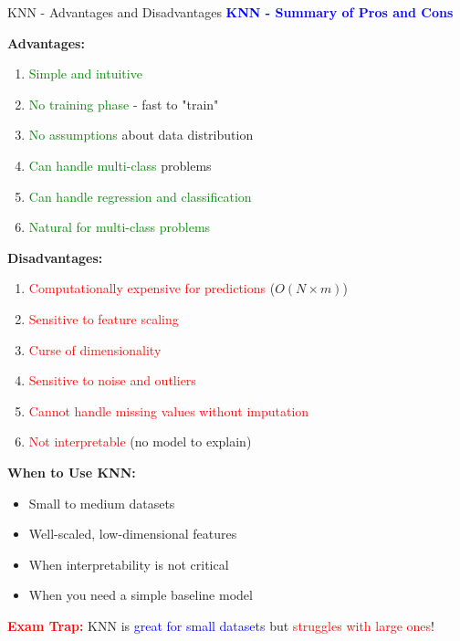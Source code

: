 \documentclass[8pt]{beamer}
\begin{document}
	\begin{frame}{KNN - Advantages and Disadvantages}
		\fontsize{6.5}{7.5}\selectfont
		\textcolor{blue}{\textbf{KNN - Summary of Pros and Cons}}
		
		\textbf{Advantages:}
		\begin{enumerate}
			\item \textcolor{green}{Simple and intuitive}
			\item \textcolor{green}{No training phase} - fast to "train"
			\item \textcolor{green}{No assumptions} about data distribution
			\item \textcolor{green}{Can handle multi-class} problems
			\item \textcolor{green}{Can handle regression and classification}
			\item \textcolor{green}{Natural for multi-class problems}
		\end{enumerate}
		
		\textbf{Disadvantages:}
		\begin{enumerate}
			\item \textcolor{red}{Computationally expensive for predictions} ($O(N \times m)$)
			\item \textcolor{red}{Sensitive to feature scaling}
			\item \textcolor{red}{Curse of dimensionality}
			\item \textcolor{red}{Sensitive to noise and outliers}
			\item \textcolor{red}{Cannot handle missing values without imputation}
			\item \textcolor{red}{Not interpretable} (no model to explain)
		\end{enumerate}
		
		\textbf{When to Use KNN:}
		\begin{itemize}
			\item Small to medium datasets
			\item Well-scaled, low-dimensional features
			\item When interpretability is not critical
			\item When you need a simple baseline model
		\end{itemize}
		
		\textcolor{red}{\textbf{Exam Trap:}} KNN is \textcolor{blue}{great for small datasets} but \textcolor{red}{struggles with large ones}!
	\end{frame}
	
\end{document}
